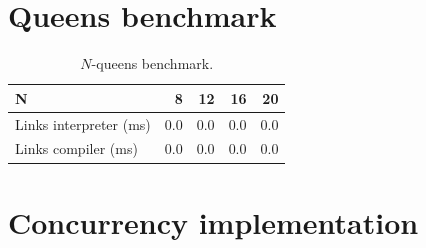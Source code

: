 \documentclass[12pt,mscres,cdtppar,twoside,openright,logo,rightchapter,normalheadings]{infthesis}
\theoremstyle{definition}
\begin{document}
\section{Queens benchmark}
\label{sec:queens-eval}

\begin{table}[H]
\centering
\begin{tabular}{| l | r | r | r | r |}
\hline
N  & 8 & 12 & 16 & 20 \\
\hline
  Links interpreter (ms) & 0.0 & 0.0 & 0.0 & 0.0\\
\hline
  Links compiler    (ms) & 0.0 & 0.0 & 0.0 & 0.0\\
\hline
\end{tabular}
\caption{$N$-queens benchmark.}\label{tbl:queens}
\end{table}

\section{Concurrency implementation}
\label{sec:concur-label}
\end{document}
